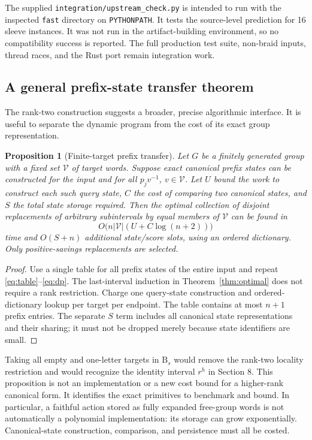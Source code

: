 \documentclass[11pt]{article}
\newtheorem{proposition}[theorem]{Proposition}
\theoremstyle{definition}
\theoremstyle{remark}
\newcommand{\B}{\mathrm B}
\begin{document}
The supplied \texttt{integration/upstream\_check.py} is intended to run with
the inspected \texttt{fast} directory on \texttt{PYTHONPATH}. It tests the
source-level prediction for 16 sleeve instances. It was not run in the
artifact-building environment, so no compatibility success is reported.
The full production test suite, non-braid inputs, thread races, and the Rust
port remain integration work.

\subsection{A general prefix-state transfer theorem}
The rank-two construction suggests a broader, precise algorithmic interface.
It is useful to separate the dynamic program from the cost of its exact
group representation.

\begin{proposition}[Finite-target prefix transfer]\label{prop:general}
Let $G$ be a finitely generated group with a fixed set $\mathcal V$ of target
words. Suppose exact canonical prefix states can be constructed for the
input and for all $p_jv^{-1}$, $v\in\mathcal V$. Let $U$ bound the work to
construct each such query state, $C$ the cost of comparing two canonical
states, and $S$ the total state storage required. Then the optimal
collection of disjoint replacements of arbitrary subintervals by equal
members of $\mathcal V$ can be found in
\[
 O\bigl(n|\mathcal V|(U+C\log(n+2))\bigr)
\]
time and $O(S+n)$ additional state/score slots, using an ordered dictionary.
Only positive-savings replacements are selected.
\end{proposition}
\begin{proof}
Use a single table for all prefix states of the entire input and repeat
\eqref{eq:table}--\eqref{eq:dp}. The last-interval induction in
Theorem~\ref{thm:optimal} does not require a rank restriction. Charge one
query-state construction and ordered-dictionary lookup per target per
endpoint. The table contains at most $n+1$ prefix entries. The separate
$S$ term includes all canonical state representations and their sharing;
it must not be dropped merely because state identifiers are small.
\end{proof}

Taking all empty and one-letter targets in $\B_s$ would remove the
rank-two locality restriction and would recognize the identity interval
$r^h$ in Section 8. This proposition is not an implementation or a new
cost bound for a higher-rank canonical form. It identifies the exact
primitives to benchmark and bound. In particular, a faithful action stored
as fully expanded free-group words is not automatically a polynomial
implementation: its storage can grow exponentially. Canonical-state
construction, comparison, and persistence must all be costed.
\end{document}
